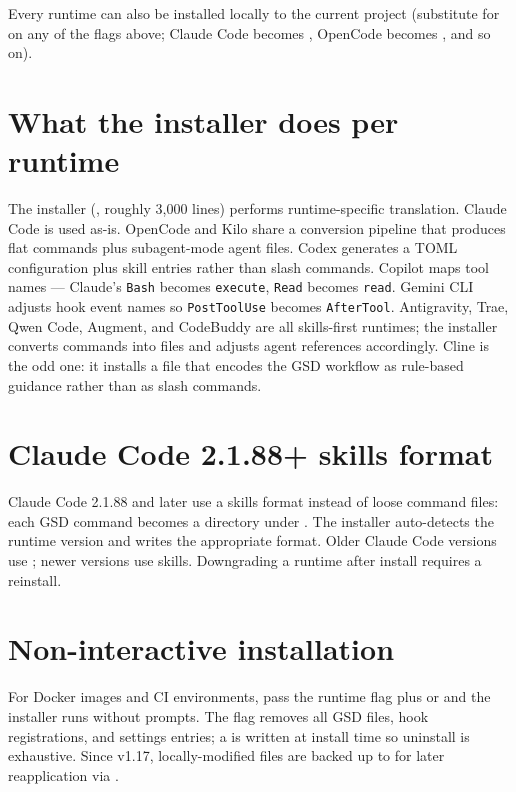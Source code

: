 \documentclass[11pt,letterpaper,openany]{book}
\begin{document}
Every runtime can also be installed locally to the current project (substitute  for  on any of the flags above; Claude Code becomes , OpenCode becomes , and so on).

\section{What the installer does per runtime}

The installer (, roughly 3,000 lines) performs runtime-specific translation. Claude Code is used as-is. OpenCode and Kilo share a conversion pipeline that produces flat commands plus subagent-mode agent files. Codex generates a TOML configuration plus skill entries rather than slash commands. Copilot maps tool names — Claude's \texttt{Bash} becomes \texttt{execute}, \texttt{Read} becomes \texttt{read}. Gemini CLI adjusts hook event names so \texttt{PostToolUse} becomes \texttt{AfterTool}. Antigravity, Trae, Qwen Code, Augment, and CodeBuddy are all skills-first runtimes; the installer converts commands into  files and adjusts agent references accordingly. Cline is the odd one: it installs a  file that encodes the GSD workflow as rule-based guidance rather than as slash commands.

\section{Claude Code 2.1.88+ skills format}

Claude Code 2.1.88 and later use a skills format instead of loose command files: each GSD command becomes a directory under . The installer auto-detects the runtime version and writes the appropriate format. Older Claude Code versions use ; newer versions use skills. Downgrading a runtime after install requires a reinstall.

\section{Non-interactive installation}

For Docker images and CI environments, pass the runtime flag plus  or  and the installer runs without prompts. The  flag removes all GSD files, hook registrations, and settings entries; a  is written at install time so uninstall is exhaustive. Since v1.17, locally-modified files are backed up to  for later reapplication via .
\end{document}
